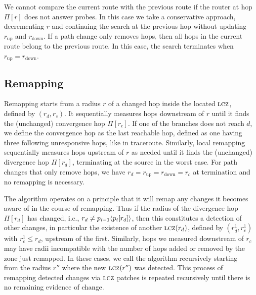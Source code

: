 We cannot compare the current route with the previous route if the
router at hop $\Pi[r]$ does not answer probes.  In this case we take a
conservative approach, decrementing $r$ and continuing the search at the
previous hop without updating $r_\mathrm{up}$ and $r_\mathrm{down}$.  If
a path change only removes hops, then all hops in the current route
belong to the previous route.  In this case, the search terminates when
$r_\mathrm{up} = r_\mathrm{down}$.




\subsection{Remapping}
\label{sec:remap.local}

Remapping starts from a radius $r$ of a changed hop inside the located
$\mathrm{\textsc{lcz}}$, defined by $(r_d,r_c)$.  It sequentially measures hops
downstream of $r$ until it finds the (unchanged) convergence hop
$\Pi[r_c]$.  If one of the branches does not reach $d$, we define the
convergence hop as the last reachable hop, defined as one having three
following unresponsive hops, like in traceroute.  Similarly, local
remapping sequentially measures hops upstream of $r$ as needed until it
finds the (unchanged) divergence hop $\Pi[r_d]$,  terminating at the
source in the worst case.    For path changes that only remove hops, we
have $r_d = r_\mathrm{up} = r_\mathrm{down}=r_c$ at termination and no
remapping is necessary.

The algorithm operates on a principle that it will remap any changes it
becomes aware of in the course of remapping.  Thus if the radius of the
divergence hop $\Pi[r_d]$ has changed, i.e., $r_d \ne p_{i-1}\langle
p_i[r_d]\rangle$, then this constitutes a detection of other changes, in
particular the existence of another $\mathrm{\textsc{lcz}}(r_d)$, defined by
$(r_d^1,r_c^1)$ with $r_c^1\le r_d$, upstream of the first.  Similarly,
hops we measured downstream of $r_c$ may have radii incompatible with
the number of hops added or removed by the zone just remapped.  In these
cases, we call the algorithm recursively starting from the radius $r''$
where the new $\mathrm{\textsc{lcz}}(r'')$ was detected.  This process of remapping
detected changes via $\mathrm{\textsc{lcz}}$ patches is repeated recursively until there
is no remaining evidence of change.

